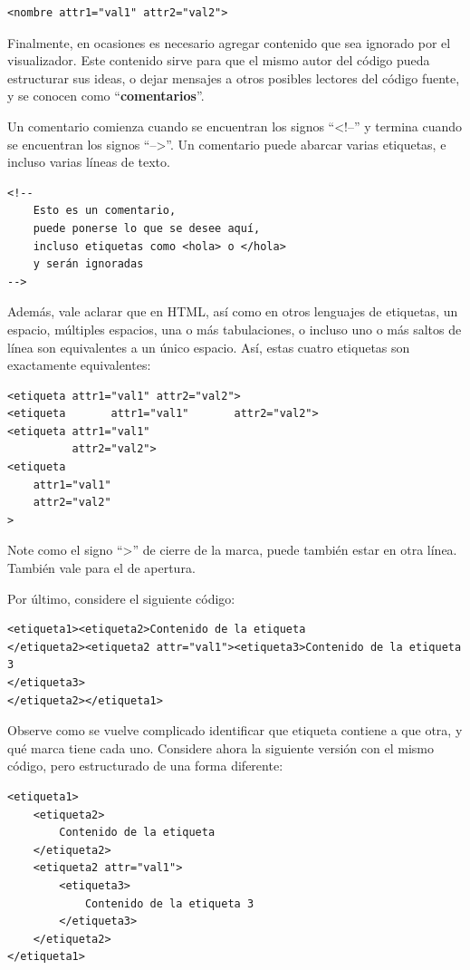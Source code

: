\begin{lstlisting}[language=XHTML]
<nombre attr1="val1" attr2="val2">
\end{lstlisting}

Finalmente, en ocasiones es necesario agregar contenido que sea ignorado por
el visualizador. Este contenido sirve para que el mismo autor del código pueda
estructurar sus ideas, o dejar mensajes a otros posibles lectores del código
fuente, y se conocen como ``\textbf{comentarios}''.

Un comentario comienza cuando se encuentran los signos ``<!--'' y termina cuando 
se encuentran los signos ``-->''. Un comentario puede abarcar varias etiquetas,
e incluso varias líneas de texto.

\begin{lstlisting}[language=XHTML]
<!--
    Esto es un comentario,
    puede ponerse lo que se desee aquí, 
    incluso etiquetas como <hola> o </hola>
    y serán ignoradas
-->
\end{lstlisting}

Además, vale aclarar que en HTML, así como en otros lenguajes de etiquetas, un
espacio, múltiples espacios, una o más tabulaciones, o incluso uno o más saltos
de línea son equivalentes a un único espacio. Así, estas cuatro etiquetas son
exactamente equivalentes:

\begin{lstlisting}[language=XHTML]
<etiqueta attr1="val1" attr2="val2">
<etiqueta       attr1="val1"       attr2="val2">
<etiqueta attr1="val1"
          attr2="val2">
<etiqueta
    attr1="val1"
    attr2="val2"
>
\end{lstlisting}

Note como el signo ``>'' de cierre de la marca, puede también estar en otra línea.
También vale para el de apertura.

Por último, considere el siguiente código:
\begin{lstlisting}[language=XHTML]
<etiqueta1><etiqueta2>Contenido de la etiqueta
</etiqueta2><etiqueta2 attr="val1"><etiqueta3>Contenido de la etiqueta 3
</etiqueta3>
</etiqueta2></etiqueta1>
\end{lstlisting}

Observe como se vuelve complicado identificar que etiqueta contiene a que otra,
y qué marca tiene cada uno. Considere ahora la siguiente versión con el mismo
código, pero estructurado de una forma diferente:

\begin{lstlisting}[language=XHTML]
<etiqueta1>
    <etiqueta2>
        Contenido de la etiqueta
    </etiqueta2>
    <etiqueta2 attr="val1">
        <etiqueta3>
            Contenido de la etiqueta 3
        </etiqueta3>
    </etiqueta2>
</etiqueta1>
\end{lstlisting}

